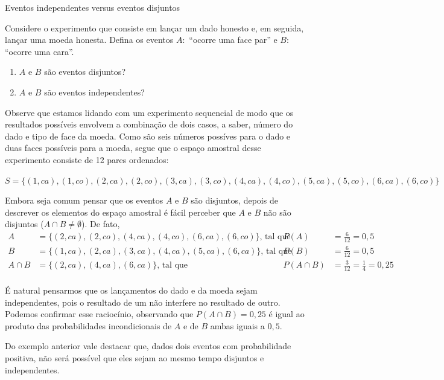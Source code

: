 \begin{example}{Eventos independentes versus eventos disjuntos}

Considere o experimento que consiste em lançar um dado honesto e, em seguida, lançar uma moeda honesta. Defina os eventos \(A:\) “ocorre uma face par” e \(B:\) “ocorre uma cara”.
\begin{enumerate}
\item {} 
\(A\) e \(B\) são eventos disjuntos?

\item {} 
\(A\) e \(B\) são eventos independentes?

\end{enumerate}

Observe que estamos lidando com um experimento sequencial de modo que os resultados possíveis envolvem a combinação de dois casos, a saber, número do dado e tipo de face da moeda. Como são seis números possíves para o dado e duas faces possíveis para a moeda, segue que o espaço amostral desse experimento consiste de 12 pares ordenados:

\(S=\{(1,ca),(1,co),(2,ca),(2,co),(3,ca),(3,co),(4,ca),(4,co),(5,ca),(5,co),(6,ca),(6,co)\}\)

Embora seja comum pensar que os eventos \(A\) e \(B\) são disjuntos, depois de descrever os elementos do espaço amostral é fácil perceber que $A$ e  $B$ não são disjuntos (\(A\cap B\neq \emptyset\)). De fato,
\begin{align*}
A&=\{(2,ca),(2,co),(4,ca),(4,co),(6,ca),(6,co)\}\text{, tal que } &P(A)&=\frac{6}{12}=0{,}5\\
B&=\{(1,ca),(2,ca),(3,ca),(4,ca),(5,ca),(6,ca)\} \text{, tal que } &P(B)&=\frac{6}{12}=0{,}5\\
A\cap B&=\{(2,ca),(4,ca),(6,ca)\} \text{, tal que }&P(A\cap B)&=\frac{3}{12}=\frac{1}{4}=0{,}25\\
\end{align*}

É natural pensarmos que os lançamentos do dado e da moeda sejam independentes, pois o resultado de um não interfere no resultado de outro. Podemos confirmar esse raciocínio, observando que \(P(A\cap B)=0{,}25\) é igual ao produto das probabilidades incondicionais de \(A\) e de \(B\)  ambas iguais a $0{,}5$.
\end{example}

Do exemplo anterior vale destacar que, dados dois eventos com probabilidade positiva, não será possível que eles sejam ao mesmo tempo disjuntos e independentes.

